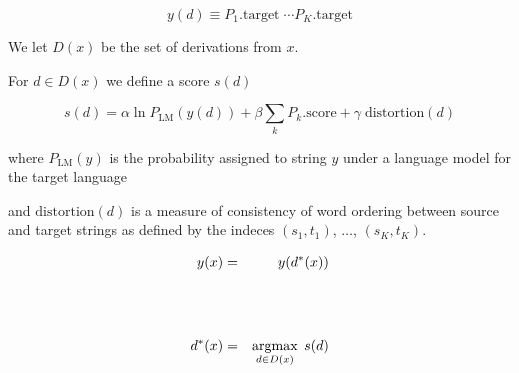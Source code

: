 {$$ y(d) \equiv P_1.\mathrm{target}\;\cdots P_K.\mathrm{target}$$

\vfill
We let $D(x)$ be the set of derivations from $x$.


For $d \in D(x)$ we define a score $s(d)$

\vfill
$$s(d) = \alpha \ln P_\mathrm{LM}(y(d)) + \beta \sum_k P_k.\mathrm{score} + \gamma \;\mathrm{distortion}(d)$$

\vfill
where $P_{\mathrm{LM}}(y)$ is the probability assigned to string $y$ under a language model for the target language

\vfill
and $\mathrm{distortion}(d)$ is a measure of consistency of word ordering between source and target strings as defined by
the indeces $(s_1,t_1)$, $\ldots$, $(s_K,t_K)$.


\begin{eqnarray*}
  y(x) & = & y(d^*(x)) \\
  \\
  \\
  \\
  d^*(x) & = & \operatorname*{argmax}_{d \in D(x)} \;s(d)
\end{eqnarray*}

}


